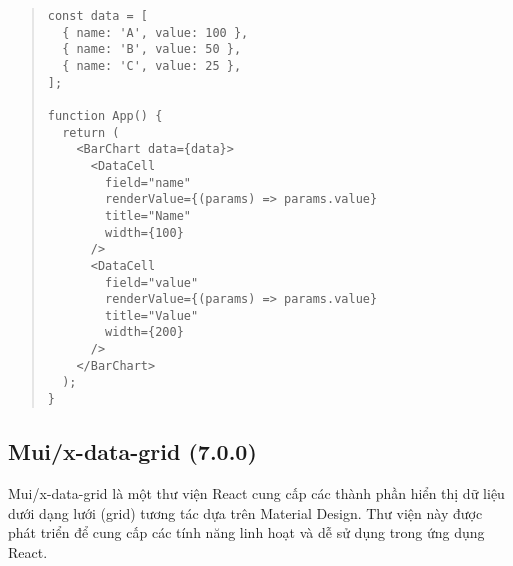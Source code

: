 \begin{quote}
\begin{lstlisting}
const data = [
  { name: 'A', value: 100 },
  { name: 'B', value: 50 },
  { name: 'C', value: 25 },
];

function App() {
  return (
    <BarChart data={data}>
      <DataCell
        field="name"
        renderValue={(params) => params.value}
        title="Name"
        width={100}
      />
      <DataCell
        field="value"
        renderValue={(params) => params.value}
        title="Value"
        width={200}
      />
    </BarChart>
  );
}
\end{lstlisting}
\end{quote}

\subsection{Mui/x-data-grid (7.0.0)}

Mui/x-data-grid là một thư viện React cung cấp các thành phần hiển thị dữ liệu dưới dạng lưới (grid) tương tác dựa trên Material Design. Thư viện này được phát triển để cung cấp các tính năng linh hoạt và dễ sử dụng trong ứng dụng React.

